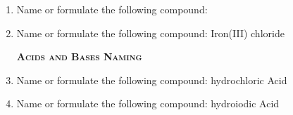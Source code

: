 \documentclass[main.tex]{subfiles}
\begin{document}
\begin{multicols*}{2}
\begin{enumerate}
\item Name or formulate the following compound: 
\begin{enumerate}[label=(\alph*)]
\end{enumerate}

\item Name or formulate the following compound: Iron(III) chloride
\begin{enumerate}[label=(\alph*)]
\end{enumerate}



{\raggedright\textsc{\textbf{Acids and Bases Naming}}\par}


\item  Name or formulate the following compound: hydrochloric Acid
\begin{enumerate}[label=(\alph*)]
\end{enumerate}



\item  Name or formulate the following compound: hydroiodic Acid
\begin{enumerate}[label=(\alph*)]
\end{enumerate}



\end{enumerate}
\end{multicols*}
\end{document}
